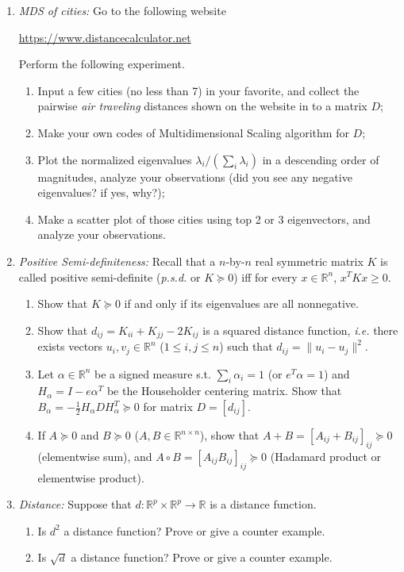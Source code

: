 \documentclass[11pt]{article}
\def\R{{\mathbb R}}
\begin{document}
\begin{enumerate}
\item {\em MDS of cities:} Go to the following website

\url{https://www.distancecalculator.net}

Perform the following experiment. 
\begin{enumerate}
\item Input a few cities (no less than 7) in your favorite, and collect the pairwise \emph{air traveling} distances shown on the website in to a matrix $D$;
\item Make your own codes of Multidimensional Scaling algorithm for $D$;
\item Plot the normalized eigenvalues $\lambda_i / (\sum_i \lambda_i)$ in a descending order of magnitudes, analyze your observations (did you see any negative eigenvalues? if yes, why?);
\item Make a scatter plot of those cities using top 2 or 3 eigenvectors, and analyze your observations. 
\end{enumerate}



\item {\em Positive Semi-definiteness:} Recall that a $n$-by-$n$ real symmetric matrix $K$ is called positive semi-definite (\emph{p.s.d.} or $K\succeq 0$) iff for every $x\in \R^n$, $x^T K x\geq 0$. 
\begin{enumerate}
\item Show that $K\succeq 0$ if and only if its eigenvalues are all nonnegative.
\item Show that $d_{ij}=K_{ii} + K_{jj} - 2 K_{ij}$ is a squared distance function, \emph{i.e.} there exists vectors $u_i,v_j \in \R^n$ ($1\leq i,j \leq n$) such that $d_{ij} = \|u_i - u_j\|^2$. 
\item Let $\alpha\in \R^n$ be a signed measure s.t. $\sum_i \alpha_i = 1$ (or $e^T \alpha =1$) and $H_\alpha= I - e \alpha^T$ be the Householder centering matrix. Show that $B_\alpha= - \frac{1}{2} H_\alpha D H_\alpha^T\succeq 0$ for matrix $D=[d_{ij}]$. 
\item If $A\succeq 0$ and $B\succeq 0$ ($A,B\in \R^{n\times n}$), show that $A+B = [A_{ij} + B_{ij}]_{ij} \succeq 0$ (elementwise sum), and $A\circ B= [A_{ij} B_{ij}]_{ij} \succeq 0$ (Hadamard product or elementwise product).
\end{enumerate}

\item {\em Distance:} Suppose that $d: \R^p \times \R^p \to \R$ is a distance function. 
\begin{enumerate}
\item Is $d^2$ a distance function? Prove or give a counter example.
\item Is $\sqrt{d}$ a distance function? Prove or give a counter example.
\end{enumerate}




\end{enumerate}
\end{document}
